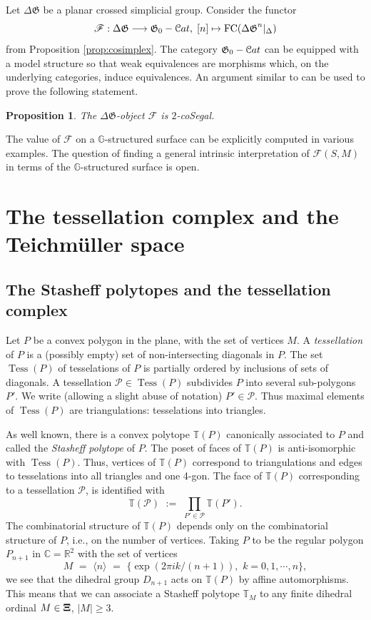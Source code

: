 \documentclass[english,11pt,leqno]{article}
\def\CC{\mathbb{C}}
\def\GG{\mathbb{G}}
\def\RR{\mathbb{R}}
\def\TT{{\mathbb{T}}}
\def\scrF{\mathscr{F}}
\def\F{\scrF}
\def\Gen{\mathfrak{G}}
\def\Pc{\mathcal{P}}
\def\on{\operatorname}
\def\lra{\longrightarrow}
\def\Cat{{\mathcal Cat}}
\def\cn{\langle n \rangle}
\def\FC{\operatorname{FC}}
\def\FC{\on{FC}}
\def\Cat{{\EuScript Cat}}
\def\cn{\langle n \rangle}
\def\DG{ {\Delta \Gen}}
\def\Tess{\on{Tess}}
\newtheorem{prop}[thm]{Proposition}
\theoremstyle{definition}
\theoremstyle{remark}
\numberwithin{equation}{section}
\renewcommand{\thesection}{\Roman{section}}
\begin{document}
Let $\DG$ be a planar crossed simplicial group. Consider the functor
\[
	\F: \DG \lra \Gen_0-\Cat, \; [n] \mapsto \FC(\DG^n|_{\Delta})
\]
from Proposition \ref{prop:cosimplex}. The category $\Gen_0-\Cat$ can be equipped with a model
structure so that weak equivalences are morphisms which, on the underlying categories, induce
equivalences. An argument similar to \cite[7.5]{HSS1} can be used to prove the following statement.

\begin{prop} The $\DG$-object $\F$ is $2$-coSegal.
\end{prop}

The value of $\F$ on a $\GG$-structured surface can be explicitly computed in various examples.  The
question of finding a general intrinsic interpretation of $\F(S,M)$ in terms of the $\GG$-structured
surface is open.
 
\appendix
 
 \renewcommand{\thesection}{\Alph{section}}
 
 \newpage
\section{The tessellation complex and the Teichm\"uller space}
\subsection{The Stasheff polytopes and the tessellation complex}
 
 Let $P$ be a convex polygon in the plane, with the set of vertices $M$. 
 A {\em tessellation} of $P$ is a (possibly empty) set of non-intersecting diagonals in $P$.
 The set $\Tess(P)$ of tesselations of $P$ is partially ordered by inclusions of
 sets of diagonals. A tessellation $\Pc\in\Tess(P)$ subdivides $P$ into several
 sub-polygons $P'$. We write (allowing a slight abuse of notation) $P'\in\Pc$. Thus maximal elements
 of $\Tess(P)$ are triangulations: tesselations into triangles. 
 
 As well known, there is a convex polytope $\TT(P)$ canonically associated to $P$
 and called the {\em Stasheff polytope} of $P$. The poset of faces of $\TT(P)$ is
 anti-isomorphic with $\Tess(P)$. Thus, vertices of $\TT(P)$ correspond to triangulations 
 and edges to tesselations into all triangles and one 4-gon. The face of $\TT(P)$ corresponding
 to a tessellation $\Pc$, is identified with
 \[
 \TT(\Pc) \,\, := \,\, \prod_{P'\in\Pc}\TT(P'). 
 \]
 The combinatorial structure of $\TT(P)$ depends only on the combinatorial structure of $P$,
 i.e., on the number of vertices. Taking $P$ to be the regular polygon $P_{n+1}$ in $\CC=\RR^2$ with
 the set of vertices 
 \[
 M \,\,=\,\, \cn \,\, = \,\, \bigl\{ \exp(2\pi i k /(n+1)), \,\, k=0, 1, \cdots, n\bigr\}, 
 \]
 we see that the dihedral group $D_{n+1}$ acts on $\TT(P)$ by affine automorphisms.
 This means that we can associate a Stasheff polytope $\TT_M$ to any finite dihedral ordinal
 $M\in\bf\Xi$, $|M|\geq 3$. 
 
\end{document}
